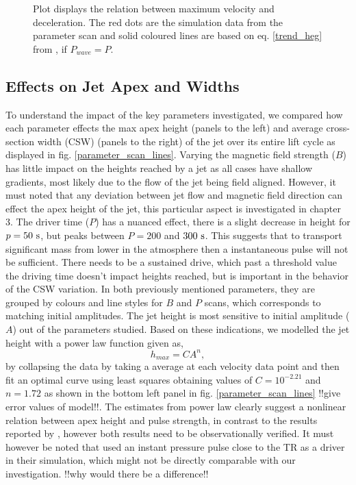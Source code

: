 \documentclass[12pt]{ociamthesis}
\newcommand{\fref}[1]{fig. \ref{#1}}
\newcommand{\np}{\\ \\}
\begin{document}
\begin{figure}
\captionsetup[subfigure]{labelformat=empty}
\centering
{} 
\caption{Plot displays the relation between maximum velocity and deceleration. The red dots are the simulation data from the parameter scan and solid coloured lines are based on eq. \eqref{trend_heg} from \cite{Heggland2007ApJ6661277H}, if $P_{wave}=P$.}
\label{decell}
\end{figure}
\subsection{Effects on Jet Apex and Widths}
\label{subsec:jet_apex_widths}
To understand the impact of the key parameters investigated, we compared how each parameter effects the max apex height (panels to the left) and average cross-section width (CSW) (panels to the right) of the jet over its entire lift cycle as displayed in \fref{parameter_scan_lines}. Varying the magnetic field strength ($B$) has little impact on the heights reached by a jet as all cases have shallow gradients, most likely due to the flow of the jet being field aligned. However, it must noted that any deviation between jet flow and magnetic field direction can effect the apex height of the jet, this particular aspect is investigated in chapter 3. The driver time ($P$) has a nuanced effect, there is a slight decrease in height for $p=50~\rm{s}$, but peaks between $P=200$ and $300~\rm{s}$. This suggests that to transport significant mass from lower in the atmosphere then a instantaneous pulse will not be sufficient. There needs to be a sustained drive, which past a threshold value the driving time doesn't impact heights reached, but is important in the behavior of the CSW variation. In both previously mentioned parameters, they are grouped by colours and line styles for $B$ and $P$ scans, which corresponds to matching initial amplitudes. The jet height is most sensitive to initial amplitude ($A$) out of the parameters studied. Based on these indications, we modelled the jet height with a power law function given as,   
\begin{equation}
h_{max} = C A^{n},
\end{equation} 
by collapsing the data by taking a average at each velocity data point and then fit an optimal curve using least squares obtaining values of $C= 10^{-2.21}$ and $n= 1.72$ as shown in the bottom left panel in \fref{parameter_scan_lines} {\color{green}!!give error values of model!!}. The estimates from power law clearly suggest a nonlinear relation between apex height and pulse strength, in contrast to the results reported by \citet{Singh2019}, however both results need to be observationally verified. It must however be noted that \citet{Singh2019} used an instant pressure pulse close to the TR as a driver in their simulation, which might not be directly comparable with our investigation. {\color{green}!!why would there be a difference!!} \np  
\end{document}
